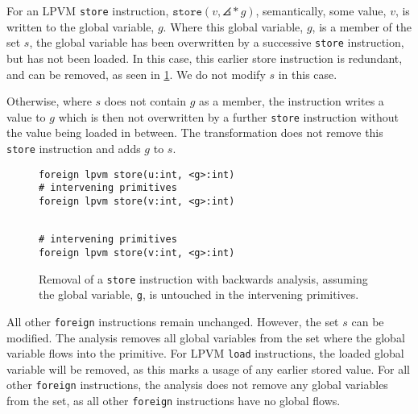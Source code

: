 For an LPVM \texttt{store} instruction, $\mathtt{store}(v, \angles*{g})$, semantically, some value, $v$, is written to the global variable, $g$. Where this global variable, $g$, is a member of the set $s$, the global variable has been overwritten by a successive \texttt{store} instruction, but has not been loaded. In this case, this earlier store instruction is redundant, and can be removed, as seen in \cref{lst:bwd-opt-store}. We do not modify $s$ in this case. 

Otherwise, where $s$ does not contain $g$ as a member, the instruction writes a value to $g$ which is then not overwritten by a further \texttt{store} instruction without the value being loaded in between. The transformation does not remove this \texttt{store} instruction and adds $g$ to $s$.

\begin{figure}[ht]
  \begin{minipage}[t]{.48\textwidth}
    \begin{lstlisting}
foreign lpvm store(u:int, <g>:int)
# intervening primitives
foreign lpvm store(v:int, <g>:int)
\end{lstlisting}
  \end{minipage}\hfill
  \begin{minipage}[t]{.48\textwidth}
    \begin{lstlisting}[numbers=none]

# intervening primitives
foreign lpvm store(v:int, <g>:int)
\end{lstlisting}
  \end{minipage}
  \caption[Removal of a \texttt{store} instruction with backwards analysis.]{Removal of a \texttt{store} instruction with backwards analysis, assuming the global variable, \texttt{g}, is untouched in the intervening primitives.}
  \label{lst:bwd-opt-store}
\end{figure}

All other \texttt{foreign} instructions remain unchanged. However, the set $s$ can be modified. The analysis removes all global variables from the set where the global variable flows into the primitive. For LPVM \texttt{load} instructions, the loaded global variable will be removed, as this marks a usage of any earlier stored value. For all other \texttt{foreign} instructions, the analysis does not remove any global variables from the set, as all other \texttt{foreign} instructions have no global flows. 

